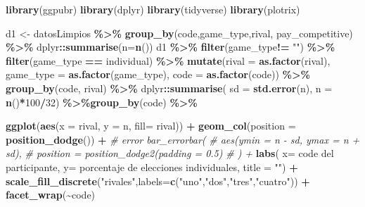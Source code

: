 \documentclass[
]{article}
\newenvironment{Shaded}{\begin{snugshade}}{\end{snugshade}}
\newcommand{\AttributeTok}[1]{\textcolor[rgb]{0.13,0.29,0.53}{#1}}
\newcommand{\CommentTok}[1]{\textcolor[rgb]{0.56,0.35,0.01}{\textit{#1}}}
\newcommand{\DecValTok}[1]{\textcolor[rgb]{0.00,0.00,0.81}{#1}}
\newcommand{\FunctionTok}[1]{\textcolor[rgb]{0.13,0.29,0.53}{\textbf{#1}}}
\newcommand{\NormalTok}[1]{#1}
\newcommand{\OtherTok}[1]{\textcolor[rgb]{0.56,0.35,0.01}{#1}}
\newcommand{\SpecialCharTok}[1]{\textcolor[rgb]{0.81,0.36,0.00}{\textbf{#1}}}
\newcommand{\StringTok}[1]{\textcolor[rgb]{0.31,0.60,0.02}{#1}}
\begin{document}
\begin{Shaded}
\begin{Highlighting}[]
\FunctionTok{library}\NormalTok{(ggpubr)}
\FunctionTok{library}\NormalTok{(dplyr)}
\FunctionTok{library}\NormalTok{(tidyverse)}
\FunctionTok{library}\NormalTok{(plotrix)}

\NormalTok{d1 }\OtherTok{\textless{}{-}}\NormalTok{ datosLimpios }\SpecialCharTok{\%\textgreater{}\%}
    \FunctionTok{group\_by}\NormalTok{(code,game\_type,rival, pay\_competitive) }\SpecialCharTok{\%\textgreater{}\%} 
\NormalTok{  dplyr}\SpecialCharTok{::}\FunctionTok{summarise}\NormalTok{(}\AttributeTok{n=}\FunctionTok{n}\NormalTok{())  }
\NormalTok{d1 }\SpecialCharTok{\%\textgreater{}\%}  
  \FunctionTok{filter}\NormalTok{(game\_type}\SpecialCharTok{!=} \StringTok{""}\NormalTok{) }\SpecialCharTok{\%\textgreater{}\%} 
  \FunctionTok{filter}\NormalTok{(game\_type }\SpecialCharTok{==} \StringTok{\textquotesingle{}individual\textquotesingle{}}\NormalTok{) }\SpecialCharTok{\%\textgreater{}\%}
  \FunctionTok{mutate}\NormalTok{(}\AttributeTok{rival =} \FunctionTok{as.factor}\NormalTok{(rival),}
              \AttributeTok{game\_type =} \FunctionTok{as.factor}\NormalTok{(game\_type),}
         \AttributeTok{code =} \FunctionTok{as.factor}\NormalTok{(code)) }\SpecialCharTok{\%\textgreater{}\%}
  \FunctionTok{group\_by}\NormalTok{(code, rival) }\SpecialCharTok{\%\textgreater{}\%}
\NormalTok{  dplyr}\SpecialCharTok{::}\FunctionTok{summarise}\NormalTok{(}
    \AttributeTok{sd =} \FunctionTok{std.error}\NormalTok{(n),}
    \AttributeTok{n =} \FunctionTok{n}\NormalTok{()}\SpecialCharTok{*}\DecValTok{100}\SpecialCharTok{/}\DecValTok{32}\NormalTok{) }\SpecialCharTok{\%\textgreater{}\%}\FunctionTok{group\_by}\NormalTok{(code) }\SpecialCharTok{\%\textgreater{}\%} 
 
  \FunctionTok{ggplot}\NormalTok{(}\FunctionTok{aes}\NormalTok{(}\AttributeTok{x =}\NormalTok{ rival, }\AttributeTok{y =}\NormalTok{ n, }\AttributeTok{fill=}\NormalTok{ rival)) }\SpecialCharTok{+}
  \FunctionTok{geom\_col}\NormalTok{(}\AttributeTok{position =} \FunctionTok{position\_dodge}\NormalTok{()) }\SpecialCharTok{+}
  \CommentTok{\# error bar\_errorbar(}
  \CommentTok{\#   aes(ymin = n {-} sd, ymax = n + sd),}
  \CommentTok{\#    position = position\_dodge2(padding = 0.5)}
  \CommentTok{\# ) + }
  \FunctionTok{labs}\NormalTok{(}
    \AttributeTok{x=} \StringTok{\textquotesingle{}code del participante\textquotesingle{}}\NormalTok{,}
    \AttributeTok{y=} \StringTok{\textquotesingle{}porcentaje de elecciones individuales\textquotesingle{}}\NormalTok{,}
    \AttributeTok{title =} \StringTok{""}\NormalTok{) }\SpecialCharTok{+}
  \FunctionTok{scale\_fill\_discrete}\NormalTok{(}\StringTok{"rivales"}\NormalTok{,}\AttributeTok{labels=}\FunctionTok{c}\NormalTok{(}\StringTok{"uno"}\NormalTok{,}\StringTok{"dos"}\NormalTok{,}\StringTok{"tres"}\NormalTok{,}\StringTok{"cuatro"}\NormalTok{)) }\SpecialCharTok{+} \FunctionTok{facet\_wrap}\NormalTok{(}\SpecialCharTok{\textasciitilde{}}\NormalTok{code)}
\end{Highlighting}
\end{Shaded}
\end{document}
